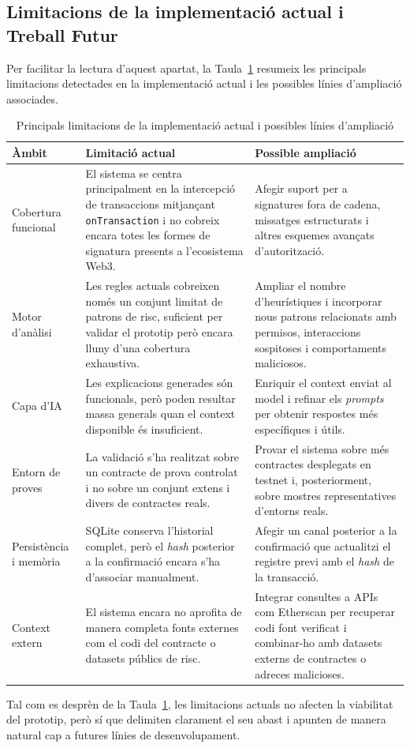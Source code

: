 \subsection{Limitacions de la implementació actual i Treball Futur}

Per facilitar la lectura d’aquest apartat, la Taula~\ref{tab:limitacions_impl} resumeix les principals limitacions detectades en la implementació actual i les possibles línies d’ampliació associades.

\begin{table}[H]
\centering
\renewcommand{\arraystretch}{1.2}
\begin{tabularx}{\textwidth}{l X X}
\hline
\textbf{Àmbit} & \textbf{Limitació actual} & \textbf{Possible ampliació} \\
\hline

Cobertura funcional &
El sistema se centra principalment en la intercepció de transaccions mitjançant \texttt{onTransaction} i no cobreix encara totes les formes de signatura presents a l’ecosistema Web3. &
Afegir suport per a signatures fora de cadena, missatges estructurats i altres esquemes avançats d’autorització. \\

Motor d’anàlisi &
Les regles actuals cobreixen només un conjunt limitat de patrons de risc, suficient per validar el prototip però encara lluny d’una cobertura exhaustiva. &
Ampliar el nombre d’heurístiques i incorporar nous patrons relacionats amb permisos, interaccions sospitoses i comportaments maliciosos. \\

Capa d’IA &
Les explicacions generades són funcionals, però poden resultar massa generals quan el context disponible és insuficient. &
Enriquir el context enviat al model i refinar els \textit{prompts} per obtenir respostes més específiques i útils. \\

Entorn de proves &
La validació s’ha realitzat sobre un contracte de prova controlat i no sobre un conjunt extens i divers de contractes reals. &
Provar el sistema sobre més contractes desplegats en testnet i, posteriorment, sobre mostres representatives d’entorns reals. \\

Persistència i memòria &
SQLite conserva l'historial complet, però el \textit{hash} posterior a la confirmació encara s'ha d'associar manualment. &
Afegir un canal posterior a la confirmació que actualitzi el registre previ amb el \textit{hash} de la transacció. \\

Context extern &
El sistema encara no aprofita de manera completa fonts externes com el codi del contracte o datasets públics de risc. &
Integrar consultes a APIs com Etherscan per recuperar codi font verificat i combinar-ho amb datasets externs de contractes o adreces malicioses. \\

\hline
\end{tabularx}
\caption{Principals limitacions de la implementació actual i possibles línies d’ampliació}
\label{tab:limitacions_impl}
\end{table}

Tal com es desprèn de la Taula~\ref{tab:limitacions_impl}, les limitacions actuals no afecten la viabilitat del prototip, però sí que delimiten clarament el seu abast i apunten de manera natural cap a futures línies de desenvolupament.

